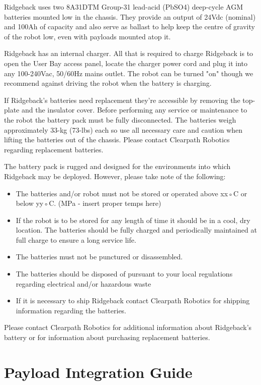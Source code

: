\documentclass[]{clearpath-latex/clearpath-manual}
\begin{document}
Ridgeback uses two 8A31DTM Group-31 lead-acid (PbSO4) deep-cycle AGM batteries mounted low in the chassis. They provide an output of 24Vdc (nominal) and 100Ah of capacity and also serve as ballast to help keep the centre of gravity of the robot low, even with payloads mounted atop it.

Ridgeback has an internal charger. All that is required to charge Ridgeback is to open the User Bay access panel, locate the charger power cord and plug it into any 100-240Vac, 50/60Hz mains outlet. The robot can be turned "on" though we recommend against driving the robot when the battery is charging.

If Ridgeback's batteries need replacement they're accessible by removing the top-plate and the insulator cover. Before performing any service or maintenance to the robot the battery pack must be fully disconnected. The batteries weigh approximately 33-kg (73-lbs) each so use all necessary care and caution when lifting the batteries out of the chassis. Please contact Clearpath Robotics regarding replacement batteries.

The battery pack is rugged and designed for the environments into which Ridgeback may be deployed. However, please take note of the following:

\begin{itemize}[nolistsep]
	\item The batteries and/or robot must not be stored or operated above xx◦C or below yy◦C. (MPa - insert proper temps here)
	\item If the robot is to be stored for any length of time it should be in a cool, dry location. The batteries should be fully charged and periodically maintained at full charge to ensure a long service life.
	\item The batteries must not be punctured or disassembled.
	\item The batteries should be disposed of pursuant to your local regulations regarding electrical and/or hazardous waste
	\item If it is necessary to ship Ridgeback contact Clearpath Robotics for shipping information regarding the batteries.
\end{itemize}

Please contact Clearpath Robotics for additional information about Ridgeback's battery or for information about purchasing replacement batteries.

\section{Payload Integration Guide}
\end{document}
